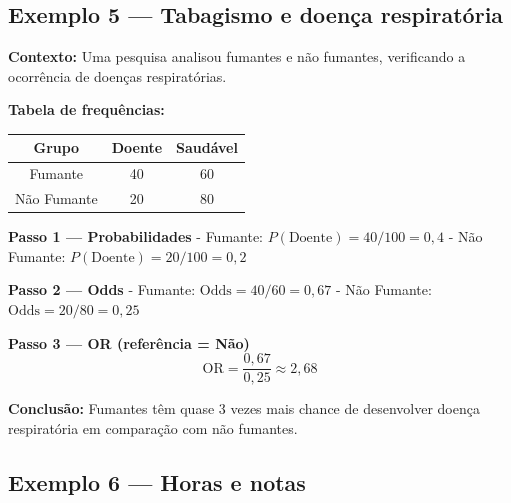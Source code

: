 
\subsection*{Exemplo 5 — Tabagismo e doença respiratória}

\begin{SolvedBox}
\textbf{Contexto:} Uma pesquisa analisou fumantes e não fumantes, verificando a ocorrência de doenças respiratórias.

\textbf{Tabela de frequências:}  

\begin{center}
\begin{tabular}{@{}c|c|c@{}}\toprule
Grupo & Doente & Saudável \\\midrule
Fumante     & 40 & 60 \\
Não Fumante & 20 & 80 \\\bottomrule
\end{tabular}
\end{center}

\textbf{Passo 1 — Probabilidades}  
- Fumante: $P(\text{Doente}) = 40/100 = 0,4$  
- Não Fumante: $P(\text{Doente}) = 20/100 = 0,2$

\textbf{Passo 2 — Odds}  
- Fumante: $\mathrm{Odds} = 40/60 = 0,67$  
- Não Fumante: $\mathrm{Odds} = 20/80 = 0,25$

\textbf{Passo 3 — OR (referência = Não)}  
\[
\mathrm{OR} = \frac{0,67}{0,25} \approx 2,68
\]

\textbf{Conclusão:} Fumantes têm quase 3 vezes mais chance de desenvolver doença respiratória em comparação com não fumantes.
\end{SolvedBox}


\subsection*{Exemplo 6 — Horas e notas}

